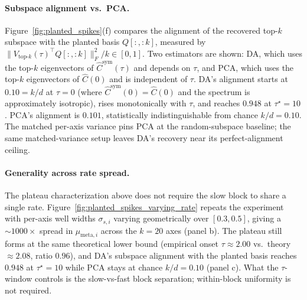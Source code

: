 \documentclass{article}
\begin{document}
\paragraph{Subspace alignment vs.\ PCA.}
Figure~\ref{fig:planted_spikes}(f) compares the alignment of the recovered top-$k$ subspace with the planted basis $Q[:, :k]$, measured by $\bigl\| V_{\text{top-}k}(\tau)^\top Q[:, :k] \bigr\|_F^2 / k \in [0, 1]$. Two estimators are shown: DA, which uses the top-$k$ eigenvectors of $\hat C^{\mathrm{sym}}(\tau)$ and depends on $\tau$, and PCA, which uses the top-$k$ eigenvectors of $\hat C(0)$ and is independent of $\tau$. DA's alignment starts at $0.10 = k/d$ at $\tau = 0$ (where $\hat C^{\mathrm{sym}}(0) = \hat C(0)$ and the spectrum is approximately isotropic), rises monotonically with $\tau$, and reaches $0.948$ at $\tau^\star = 10$. PCA's alignment is $0.101$, statistically indistinguishable from chance $k/d = 0.10$. The matched per-axis variance pins PCA at the random-subspace baseline; the same matched-variance setup leaves DA's recovery near its perfect-alignment ceiling.

\paragraph{Generality across rate spread.}
The plateau characterization above does not require the slow block to share a single rate. Figure~\ref{fig:planted_spikes_varying_rate} repeats the experiment with per-axis well widths $\sigma_{s,i}$ varying geometrically over $[0.3, 0.5]$, giving a ${\sim}1000\times$ spread in $\mu_{\mathrm{meta},i}$ across the $k = 20$ axes (panel b). The plateau still forms at the same theoretical lower bound (empirical onset $\tau \approx 2.00$ vs.\ theory $\approx 2.08$, ratio $0.96$), and DA's subspace alignment with the planted basis reaches $0.948$ at $\tau^\star = 10$ while PCA stays at chance $k/d = 0.10$ (panel c). What the $\tau$-window controls is the slow-vs-fast block separation; within-block uniformity is not required.
\end{document}
